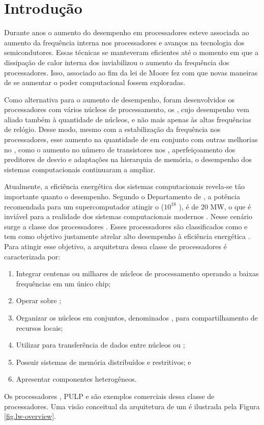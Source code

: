 \chapter{Introdução}
\label{chap.intro}
Durante anos o aumento do desempenho em processadores esteve associada ao aumento da frequência interna nos processadores e avanços na tecnologia dos semicondutores. Essas técnicas se manteveram eficientes até o momento em que a dissipação de calor interna dos \chips inviabilizou o aumento da frequência dos processadores. Isso, associado ao fim da lei de Moore \cite{moore:1965} fez com que novas maneiras de se aumentar o poder computacional fossem exploradas.

Como alternativa para o aumento de desempenho, foram desenvolvidos 
os processadores com vários núcleos de processamento, os \multicores,
cujo desempenho vem aliado também à quantidade de núcleos, e não mais 
apenas às altas frequências de relógio. Desse modo, mesmo com a estabilização da frequência nos processadores, esse aumento na quantidade de \cores em conjunto com outras melhorias no \hardware, como o aumento no número de transistores nos \chips, aperfeiçoamento dos preditores de desvio e adaptações na hierarquia de memória, o desempenho dos sistemas computacionais continuaram a ampliar.

Atualmente, a eficiência energética dos sistemas computacionais
revela-se tão importante quanto o desempenho. Segundo o Departamento de \darpa, a potência recomendada para um supercomputador atingir o \exascale
($10^{18}$ \flops), é de 20 MW, o que é inviável para a realidade dos sistemas computacionais modernos \cite{darpa:exascale}. Nesse cenário surge a classe dos processadores \lws. Esses processadores são classificados como \mpsocs e tem como objetivo justamente atrelar alto desempenho à eficiência energética \cite{francesquini2015}. Para atingir esse objetivo, a arquitetura dessa classe de processadores é caracterizada por:
\begin{enumerate}[label=(\roman*)]
    \item Integrar centenas ou milhares de núcleos de processamento operando a baixas frequências em um único chip;
    \item Operar sobre \mimd;
    \item Organizar os núcleos em conjuntos, denominados \clusters, para compartilhamento de recursos locais;
    \item Utilizar \nocs para transferência de dados entre núcleos ou \clusters;
    \item Possuir sistemas de memória distribuídos e restritivos; e
    \item Apresentar componentes heterogêneos.
\end{enumerate}
Os processadores \mppa \cite{dinechin:2013}, PULP \cite{pulp} e \taihulight \cite{fu2016sunway} são exemplos comerciais dessa classe de processadores. Uma visão conceitual da arquitetura de um \lw é ilustrada pela Figura \ref{fig.lw-overview}.

